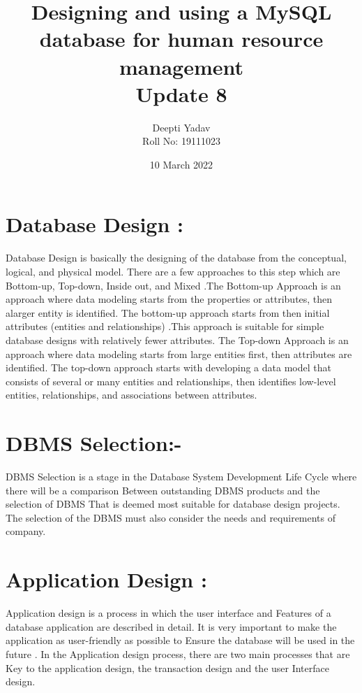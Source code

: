 \documentclass{article}
\title{ Designing and using a MySQL database for human resource management\\ Update 8}
\date{10 March 2022}
\author{Deepti Yadav\\ Roll No: 19111023 }
\begin{document}
\maketitle
\section*{Database Design : } Database Design is basically the designing of the database from the conceptual, logical, and physical model. There are a few approaches to this step
which are Bottom-up, Top-down, Inside out, and Mixed .The Bottom-up
Approach is an approach where data modeling starts from the properties or
attributes, then alarger entity is identified. The bottom-up approach starts
from then initial attributes (entities and relationships) .This approach is
suitable for simple database designs with relatively fewer attributes. The
Top-down Approach is an approach where data modeling starts from large
entities first, then attributes are identified. The top-down approach starts
with developing a data model that consists of several or many entities and
relationships, then identifies low-level entities, relationships, and associations
between attributes.
\\
\section*{DBMS Selection:- }DBMS Selection is a stage in the Database System Development Life Cycle where there will be a comparison Between outstanding DBMS products
and the selection of DBMS That is deemed most suitable for database design projects. The selection of the DBMS must also consider the needs and
requirements of company.
\\
\section*{Application Design : }Application design is a process in which the user interface and Features of
a database application are described in detail. It is very important to make
the application as user-friendly as possible to Ensure the database will be
used in the future . In the Application design process, there are two main
processes that are Key to the application design, the transaction design and
the user Interface design.
\\
\end{document}
